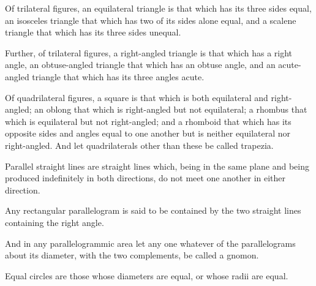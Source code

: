 \documentclass{rrxiv}
\begin{document}
\begin{scope}
\label{def:I.20}
Of trilateral figures, an equilateral triangle is that which has its
three sides equal, an isosceles triangle that which has two of its
sides alone equal, and a scalene triangle that which has its three
sides unequal.
\end{scope}

\begin{scope}
\label{def:I.21}
Further, of trilateral figures, a right-angled triangle is that which
has a right angle, an obtuse-angled triangle that which has an obtuse
angle, and an acute-angled triangle that which has its three angles
acute.
\end{scope}

\begin{scope}
\label{def:I.22}
Of quadrilateral figures, a square is that which is both equilateral
and right-angled; an oblong that which is right-angled but not
equilateral; a rhombus that which is equilateral but not right-angled;
and a rhomboid that which has its opposite sides and angles equal to
one another but is neither equilateral nor right-angled. And let
quadrilaterals other than these be called trapezia.
\end{scope}

\begin{scope}
\label{def:I.23}
Parallel straight lines are straight lines which, being in the same
plane and being produced indefinitely in both directions, do not meet
one another in either direction.
\end{scope}


\begin{scope}
\label{def:II.1}
Any rectangular parallelogram is said to be contained by the two
straight lines containing the right angle.
\end{scope}

\begin{scope}
\label{def:II.2}
And in any parallelogrammic area let any one whatever of the
parallelograms about its diameter, with the two complements, be
called a gnomon.
\end{scope}


\begin{scope}
\label{def:III.1}
Equal circles are those whose diameters are equal, or whose radii are
equal.
\end{scope}
\end{document}
